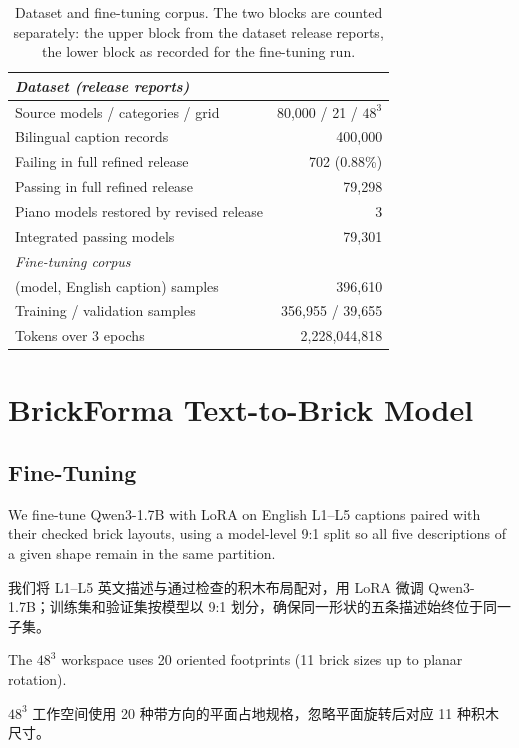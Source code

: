 \documentclass[11pt,letterpaper]{article}
\newcommand{\zh}[1]{{\chinesefont #1}}
\newcommand{\pair}[2]{\par\addvspace{4pt}\noindent
  \begin{minipage}{\linewidth}\raggedright
  #1\par\nobreak\vspace{1pt}
  {\color{translation}\chinesefont\fontsize{10.5}{15.3}\selectfont #2\par}
  \end{minipage}\par}
\begin{document}
\begin{table}[!htbp]
\centering
\small
\setlength{\tabcolsep}{4pt}
\begin{tabular}{lr}
\toprule
\multicolumn{2}{l}{\emph{Dataset (release reports)}} \\
\midrule
Source models / categories / grid & 80,000 / 21 / $48^3$ \\
Bilingual caption records & 400,000 \\
Failing in full refined release & 702 (0.88\%) \\
Passing in full refined release & 79,298 \\
Piano models restored by revised release & 3 \\
Integrated passing models & 79,301 \\
\midrule
\multicolumn{2}{l}{\emph{Fine-tuning corpus}} \\
\midrule
(model, English caption) samples & 396,610 \\
Training / validation samples & 356,955 / 39,655 \\
Tokens over 3 epochs & 2,228,044,818 \\
\bottomrule
\end{tabular}
\caption{Dataset and fine-tuning corpus. The two blocks are counted separately: the upper block from the dataset release reports, the lower block as recorded for the fine-tuning run.}
\label{tab:training-data}
\end{table}

\section{BrickForma Text-to-Brick Model\enspace\zh{BrickForma 文本生成积木模型}}

\label{sec:model}

\subsection{Fine-Tuning\enspace\zh{微调}}

\label{sec:training}

\pair{We fine-tune Qwen3-1.7B with LoRA on English L1--L5 captions paired with their checked brick layouts, using a model-level 9:1 split so all five descriptions of a given shape remain in the same partition.}{我们将 L1–L5 英文描述与通过检查的积木布局配对，用 LoRA 微调 Qwen3-1.7B；训练集和验证集按模型以 9:1 划分，确保同一形状的五条描述始终位于同一子集。}

\pair{The $48^3$ workspace uses 20 oriented footprints (11 brick sizes up to planar rotation).}{$48^3$ 工作空间使用 20 种带方向的平面占地规格，忽略平面旋转后对应 11 种积木尺寸。}
\end{document}
